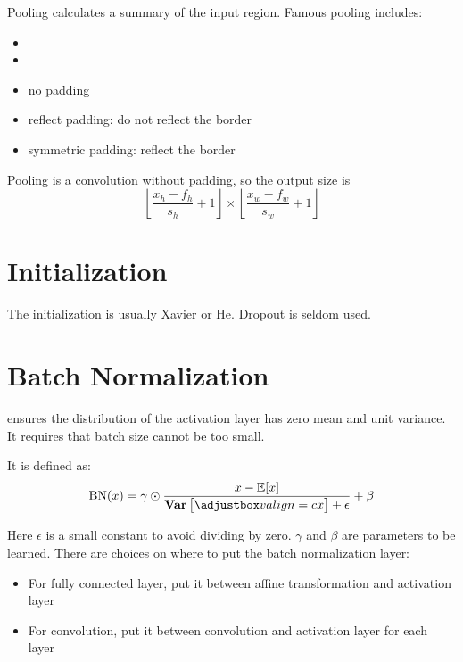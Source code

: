 Pooling calculates a summary of the input region. Famous pooling includes:
\begin{itemize}
    \item {}
    \item {}
    \item no padding
    \item reflect padding: do not reflect the border
    \item symmetric padding: reflect the border
\end{itemize}


            
            
            
Pooling is a convolution without padding, so the output size is
\begin{equation}
    \left\lfloor \frac{x_h - f_h}{s_h} + 1 \right\rfloor \times \left\lfloor \frac{x_w - f_w}{s_w} + 1 \right\rfloor
\end{equation}



\section{Initialization}

The initialization is usually Xavier or He. Dropout is seldom used.



\section{Batch Normalization}

 ensures the distribution of the activation layer has zero mean and unit variance. It requires that batch size cannot be too small. 

It is defined as:
\begin{equation}
    \text{BN}(x) = \gamma \odot \frac{x - \expectation{x}}{\variance{x} + \epsilon} + \beta
\end{equation}

Here $\epsilon$ is a small constant to avoid dividing by zero. $\gamma$ and $\beta$ are parameters to be learned. There are choices on where to put the batch normalization layer:
\begin{itemize}
    \item For fully connected layer, put it between affine transformation and activation layer
    \item For convolution, put it between convolution and activation layer for each layer
\end{itemize}

